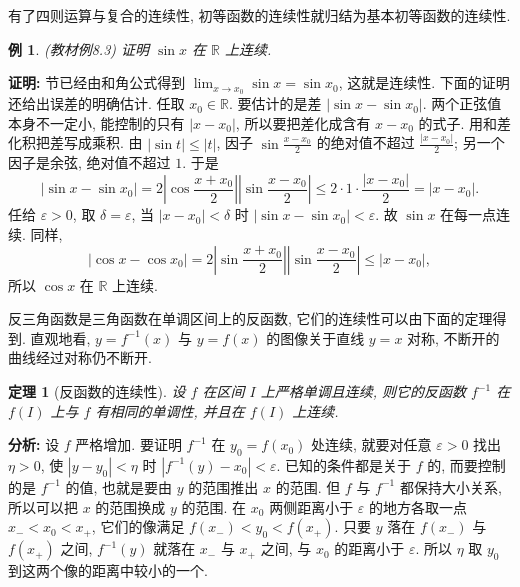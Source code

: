 \documentclass[UTF8,openany]{ctexbook}
\theoremstyle{chinesetextbook}
\newtheorem{example}{例}[section]
\newtheorem{theorem}{定理}[section]
\newenvironment{cnproof}{\par\indent\textbf{证明:} \ignorespaces}{\par}
\begin{document}
有了四则运算与复合的连续性, 初等函数的连续性就归结为基本初等函数的连续性.
\begin{example}\label{ex:8-3}
\textnormal{(教材例8.3)} 证明 $\sin x$ 在 $\mathbb R$ 上连续.
\end{example}
\begin{cnproof}
1.6 节已经由和角公式得到 $\displaystyle\lim_{x\to x_0}\sin x=\sin x_0$, 这就是连续性. 下面的证明还给出误差的明确估计. 任取 $x_0\in\mathbb R$. 要估计的是差 $|\sin x-\sin x_0|$. 两个正弦值本身不一定小, 能控制的只有 $|x-x_0|$, 所以要把差化成含有 $x-x_0$ 的式子. 用和差化积把差写成乘积. 由 $|\sin t|\le|t|$, 因子 $\displaystyle\sin\frac{x-x_0}2$ 的绝对值不超过 $\displaystyle\frac{|x-x_0|}2$; 另一个因子是余弦, 绝对值不超过 $1$. 于是
\[
|\sin x-\sin x_0|=2\left|\cos\frac{x+x_0}2\right|\left|\sin\frac{x-x_0}2\right|\le2\cdot1\cdot\frac{|x-x_0|}2=|x-x_0|.
\]
任给 $\varepsilon>0$, 取 $\delta=\varepsilon$, 当 $|x-x_0|<\delta$ 时 $|\sin x-\sin x_0|<\varepsilon$. 故 $\sin x$ 在每一点连续. 同样,
\[
|\cos x-\cos x_0|=2\left|\sin\frac{x+x_0}2\right|\left|\sin\frac{x-x_0}2\right|\le|x-x_0|,
\]
所以 $\cos x$ 在 $\mathbb R$ 上连续.
\end{cnproof}
反三角函数是三角函数在单调区间上的反函数, 它们的连续性可以由下面的定理得到. 直观地看, $y=f^{-1}(x)$ 与 $y=f(x)$ 的图像关于直线 $y=x$ 对称, 不断开的曲线经过对称仍不断开.
\begin{theorem}[反函数的连续性]
设 $f$ 在区间 $I$ 上严格单调且连续, 则它的反函数 $f^{-1}$ 在 $f(I)$ 上与 $f$ 有相同的单调性, 并且在 $f(I)$ 上连续.
\end{theorem}
\par\indent\textbf{分析:} 设 $f$ 严格增加. 要证明 $f^{-1}$ 在 $y_0=f(x_0)$ 处连续, 就要对任意 $\varepsilon>0$ 找出 $\eta>0$, 使 $|y-y_0|<\eta$ 时 $|f^{-1}(y)-x_0|<\varepsilon$. 已知的条件都是关于 $f$ 的, 而要控制的是 $f^{-1}$ 的值, 也就是要由 $y$ 的范围推出 $x$ 的范围. 但 $f$ 与 $f^{-1}$ 都保持大小关系, 所以可以把 $x$ 的范围换成 $y$ 的范围. 在 $x_0$ 两侧距离小于 $\varepsilon$ 的地方各取一点 $x_-<x_0<x_+$, 它们的像满足 $f(x_-)<y_0<f(x_+)$. 只要 $y$ 落在 $f(x_-)$ 与 $f(x_+)$ 之间, $f^{-1}(y)$ 就落在 $x_-$ 与 $x_+$ 之间, 与 $x_0$ 的距离小于 $\varepsilon$. 所以 $\eta$ 取 $y_0$ 到这两个像的距离中较小的一个.
\end{document}
